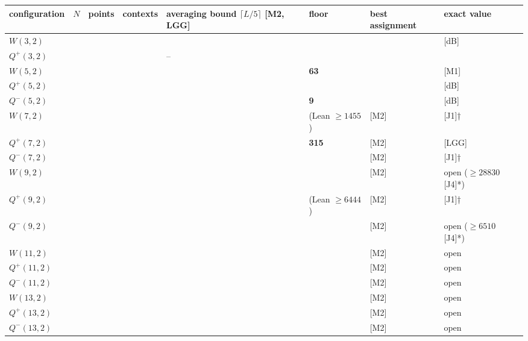 \documentclass[11pt,a4paper]{article}
\begin{document}
{\def\LTcaptype{none} %
{\footnotesize
\begin{longtable}[]{@{}>{\raggedright\arraybackslash}p{}>{\raggedright\arraybackslash}p{}>{\raggedright\arraybackslash}p{}>{\raggedright\arraybackslash}p{}>{\raggedright\arraybackslash}p{}>{\raggedright\arraybackslash}p{}>{\raggedright\arraybackslash}p{}>{\raggedright\arraybackslash}p{}@{}}
\toprule\noalign{}
configuration & \(N\) & points & contexts & averaging bound \(\lceil L/5\rceil\) {[}M2, LGG{]} & floor & best assignment & exact value \\
\midrule\noalign{}
\endhead
\bottomrule\noalign{}
\endlastfoot
\(W(3,2)\) & 2 & 15 & 15 & 3 & 2 & 3 & 3 {[}dB{]} \\
\(Q^+(3,2)\) & 2 & 9 & 6 & -- & 1 & 1 & 1 \\
\(W(5,2)\) & 3 & 63 & 315 & 63 & \textbf{63} & 63 & 63 {[}M1{]} \\
\(Q^+(5,2)\) & 3 & 35 & 105 & 21 & 14 & 21 & 21 {[}dB{]} \\
\(Q^-(5,2)\) & 3 & 27 & 45 & 9 & \textbf{9} & 9 & 9 {[}dB{]} \\
\(W(7,2)\) & 4 & 255 & 5355 & 1071 & 1451 (Lean \(\ge 1455\)) & 1575 {[}M2{]} & 1575 {[}J1{]}† \\
\(Q^+(7,2)\) & 4 & 135 & 1575 & 315 & \textbf{315} & 315 {[}M2{]} & 315 {[}LGG{]} \\
\(Q^-(7,2)\) & 4 & 119 & 1071 & 215 & 291 & 315 {[}M2{]} & 315 {[}J1{]}† \\
\(W(9,2)\) & 5 & 1023 & 86955 & 17391 & 28786 & 31479 {[}M2{]} & open (\(\ge 28830\) {[}J4{]}*) \\
\(Q^+(9,2)\) & 5 & 527 & 23715 & 4743 & 6426 (Lean \(\ge 6444\)) & 6975 {[}M2{]} & 6975 {[}J1{]}† \\
\(Q^-(9,2)\) & 5 & 495 & 19635 & 3927 & 6501 & 7087 {[}M2{]} & open (\(\ge 6510\) {[}J4{]}*) \\
\(W(11,2)\) & 6 & 4095 & 1396395 & 279279 & 527621 & 553140 {[}M2{]} & open \\
\(Q^+(11,2)\) & 6 & 2079 & 365211 & 73043 & 120901 & 132391 {[}M2{]} & open \\
\(Q^-(11,2)\) & 6 & 2015 & 332475 & 66495 & 125624 & 131700 {[}M2{]} & open \\
\(W(13,2)\) & 7 & 16383 & 22362795 & 4472559 & 9227609 & 9406024 {[}M2{]} & open \\
\(Q^+(13,2)\) & 7 & 8255 & 5720715 & 1144143 & 2161542 & 2331191 {[}M2{]} & open \\
\(Q^-(13,2)\) & 7 & 8127 & 5458635 & 1091727 & 2252409 & 2294580 {[}M2{]} & open \\
\end{longtable}
}
}
\end{document}
